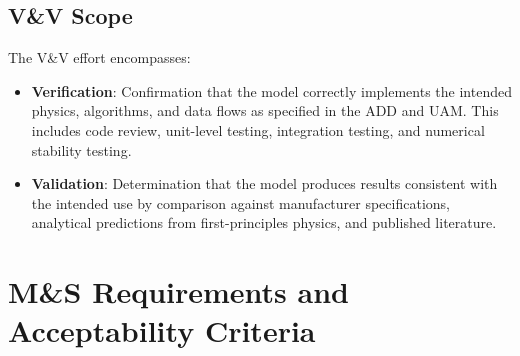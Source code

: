 \documentclass[11pt, letterpaper]{article}
\begin{document}
\subsection{\unclass V\&V Scope}

\unclass The V\&V effort encompasses:

\begin{itemize}
    \item \unclass \textbf{Verification}: Confirmation that the model correctly implements the intended physics, algorithms, and data flows as specified in the ADD and UAM. This includes code review, unit-level testing, integration testing, and numerical stability testing.
    \item \unclass \textbf{Validation}: Determination that the model produces results consistent with the intended use by comparison against manufacturer specifications, analytical predictions from first-principles physics, and published literature.
\end{itemize}

\pagebreak


\section{\unclass M\&S Requirements and Acceptability Criteria}
\end{document}
